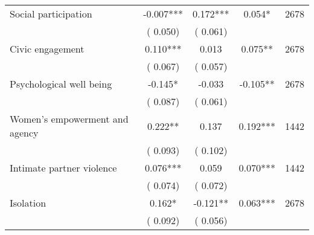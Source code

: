 \begin{tabular}{l*{4}{c}}
 Social participation &             -0.007*** &         0.172*** &           0.054* & 2678                       \\  
                 &        (       0.050)                   &        (       0.061)                        &                                                             &                                                      \\      

 Civic engagement &              0.110*** &         0.013 &           0.075** & 2678                       \\  
                 &        (       0.067)                   &        (       0.057)                        &                                                             &                                                      \\      

 Psychological well being &             -0.145* &        -0.033 &          -0.105** & 2678                       \\  
                 &        (       0.087)                   &        (       0.061)                        &                                                             &                                                      \\      

 Women's empowerment and agency &              0.222** &         0.137 &           0.192*** & 1442                       \\  
                 &        (       0.093)                   &        (       0.102)                        &                                                             &                                                      \\      

 Intimate partner violence &              0.076*** &         0.059 &           0.070*** & 1442                       \\  
                 &        (       0.074)                   &        (       0.072)                        &                                                             &                                                      \\      

 Isolation &              0.162* &        -0.121** &           0.063*** & 2678                       \\  
                 &        (       0.092)                   &        (       0.056)                        &                                                             &                                                      \\      


\end{tabular}
